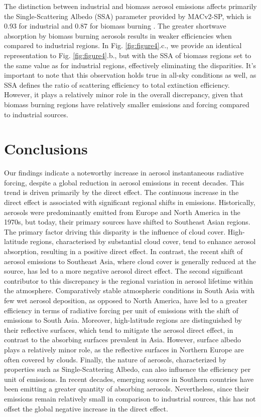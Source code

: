 \documentclass[draft]{agujournal2019}
\begin{document}
            The distinction between industrial and biomass aerosol emissions affects primarily the Single-Scattering Albedo (SSA) parameter provided by MACv2-SP, which is 0.93 for industrial and 0.87 for biomass burning \cite{Stevens_2017}. The greater shortwave absorption by biomass burning aerosols results in weaker efficiencies when compared to industrial regions. In Fig. \ref{fig:figure4}.c., we provide an identical representation to Fig. \ref{fig:figure4}.b., but with the SSA of biomass regions set to the same value as for industrial regions, effectively eliminating the disparities.
            It's important to note that this observation holds true in all-sky conditions as well, as SSA defines the ratio of scattering efficiency to total extinction efficiency. However, it plays a relatively minor role in the overall discrepancy, given that biomass burning regions have relatively smaller emissions and forcing compared to industrial sources.

\section{Conclusions}
      Our findings indicate a noteworthy increase in aerosol instantaneous radiative forcing, despite a global reduction in aerosol emissions in recent decades. This trend is driven primarily by the direct effect. The continuous increase in the direct effect is associated with significant regional shifts in emissions. Historically, aerosols were predominantly emitted from Europe and North America in the 1970s, but today, their primary sources have shifted to Southeast Asian regions.
      The primary factor driving this disparity is the influence of cloud cover. High-latitude regions, characterised by substantial cloud cover, tend to enhance aerosol absorption, resulting in a positive direct effect. In contrast, the recent shift of aerosol emissions to Southeast Asia, where cloud cover is generally reduced at the source, has led to a more negative aerosol direct effect.
      The second significant contributor to this discrepancy is the regional variation in aerosol lifetime within the atmosphere. Comparatively stable atmospheric conditions in South Asia with few wet aerosol deposition, as opposed to North America, have led to a greater efficiency in terms of radiative forcing per unit of emissions with the shift of emissions to South Asia. 
      Moreover, high-latitude regions are distinguished by their reflective surfaces, which tend to mitigate the aerosol direct effect, in contrast to the absorbing surfaces prevalent in Asia. However, surface albedo plays a relatively minor role, as the reflective surfaces in Northern Europe are often covered by clouds.
      Finally, the nature of aerosols, characterized by properties such as Single-Scattering Albedo, can also influence the efficiency per unit of emissions. In recent decades, emerging sources in Southern countries have been emitting a greater quantity of absorbing aerosols. Nevertheless, since their emissions remain relatively small in comparison to industrial sources, this has not offset the global negative increase in the direct effect.
\end{document}
